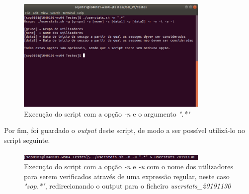 \documentclass[10pt,portuguese]{article}
\begin{document}
\begin{figure}[!h]
    \centering
    \includegraphics[width=350]{Resultados/usage.jpeg}
    \caption{Execução do script com a opção \textit{-n} e o argumento \textit{".*"}}
\end{figure}

Por fim, foi guardado o \textit{output} deste script, de modo a ser possível utilizá-lo no script seguinte.
\begin{figure}[!h]
    \centering
    \includegraphics[width=350]{Resultados/save_cat.jpeg}
    \caption{Execução do script com a opção \textit{-n} e \textit{-u} com o nome dos utilizadores para serem verificados através de uma expressão regular, neste caso \textit{"sop.*"}, redirecionando o output para o ficheiro \textit{userstats\_20191130}}
\end{figure}
\clearpage
\end{document}
